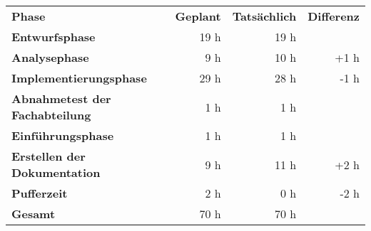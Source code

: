\begin{tabu}{lrrr}
\rowfont{\bfseries\leavevmode\color{headingfont}}\textbf{Phase} & \textbf{Geplant} & \textbf{Tatsächlich} & \textbf{Differenz} \\
\textbf{Entwurfsphase} & 19 h  & 19 h  &  \\
\textbf{Analysephase} & 9 h   & 10 h  & +1 h \\
\textbf{Implementierungsphase} & 29 h  & 28 h  & -1 h \\
\textbf{Abnahmetest der Fachabteilung} & 1 h   & 1 h   &  \\
\textbf{Einführungsphase} & 1 h   & 1 h   &  \\
\textbf{Erstellen der Dokumentation} & 9 h   & 11 h  & +2 h \\
\textbf{Pufferzeit} & 2 h   & 0 h   & -2 h \\
\hline
\hline
{}\textbf{Gesamt} & 70 h  & 70 h  &  \\
\end{tabu}
